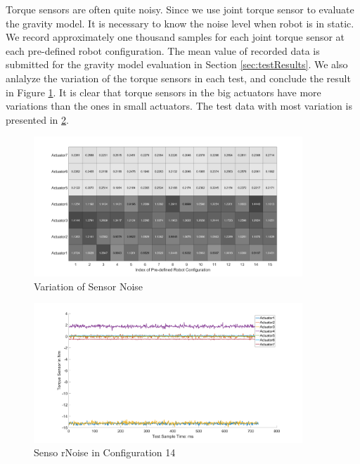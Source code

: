 Torque sensors are often quite noisy. Since we use joint torque sensor to evaluate the gravity model. It is necessary to know the noise level when robot is in static. We record approximately one thousand samples for each joint torque sensor at each pre-defined robot configuration. The mean value of recorded data is submitted for the gravity model evaluation in Section \ref{sec:testResults}. We also anlalyze the variation of the torque sensors in each test, and conclude the result in Figure \ref{fig:noiseVariation}. It is clear that torque sensors in the big actuators have more variations than the ones in small actuators. The test data with most variation is presented in \ref{fig:noiseMost}.

\begin{figure}[H]
	\begin{center}
		\includegraphics[width=0.9\textwidth]{./images/SensorNoiseVariationofallConfigurationTests.png}%
		\caption{Variation of Sensor Noise}
		\label{fig:noiseVariation}%
	\end{center}
\end{figure}


\begin{figure}[H]
	\begin{center}
		\includegraphics[width=0.9\textwidth]{./images/SensorNoiseinConfiguration14}%
		\caption{Senso rNoise in Configuration 14}
		\label{fig:noiseMost}%
	\end{center}
\end{figure}



